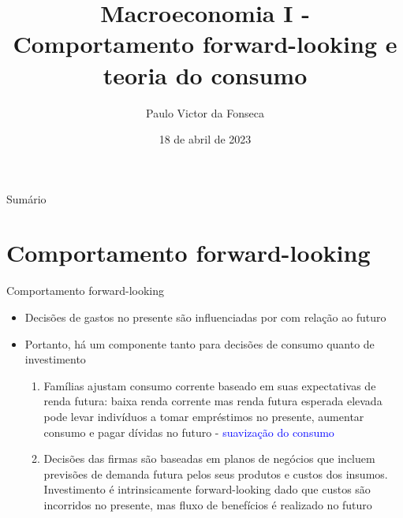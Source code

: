 \documentclass[10pt]{beamer}
\title[]{Macroeconomia I - Comportamento forward-looking e teoria do consumo}
\author[]{Paulo Victor da Fonseca}
\date{18 de abril de 2023}
\begin{document}
\begin{frame}[plain]
\end{frame}

\begin{frame}{Sumário}
    \tableofcontents
\end{frame}

\section{Comportamento forward-looking}
\begin{frame}
    {Comportamento forward-looking}
    \begin{itemize}
        \item Decisões de gastos no presente são influenciadas por  com relação ao futuro\bigskip
        \item Portanto, há um componente  tanto para decisões de consumo quanto de investimento\bigskip
        \begin{enumerate}
            \item Famílias ajustam consumo corrente baseado em suas expectativas de renda futura: baixa renda corrente mas renda futura esperada elevada pode levar indivíduos a tomar empréstimos no presente, aumentar consumo e pagar dívidas no futuro - \textcolor{blue}{suavização do consumo}\medskip
            \item Decisões das firmas são baseadas em planos de negócios que incluem previsões de demanda futura pelos seus produtos e custos dos insumos. Investimento é intrinsicamente forward-looking dado que custos são incorridos no presente, mas fluxo de benefícios é realizado no futuro
        \end{enumerate}
    \end{itemize}
\end{frame}
\end{document}
